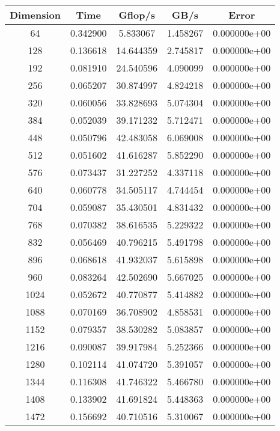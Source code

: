 \documentclass[12pt,letterpaper]{article}
\begin{document}
\begin{tabular}{ |c|c|c|c|c| } 
 \hline 
Dimension   &    Time  &  Gflop/s  &     GB/s   &       Error\\
 \hline \hline

        64  & 0.342900 &  5.833067 &  1.458267 & 0.000000e+00 \\
       128  & 0.136618 & 14.644359 &  2.745817 & 0.000000e+00 \\
       192  & 0.081910 & 24.540596 &  4.090099 & 0.000000e+00 \\
       256  & 0.065207 & 30.874997 &  4.824218 & 0.000000e+00 \\
       320  & 0.060056 & 33.828693 &  5.074304 & 0.000000e+00 \\
       384  & 0.052039 & 39.171232 &  5.712471 & 0.000000e+00 \\
       448  & 0.050796 & 42.483058 &  6.069008 & 0.000000e+00 \\
       512  & 0.051602 & 41.616287 &  5.852290 & 0.000000e+00 \\
       576  & 0.073437 & 31.227252 &  4.337118 & 0.000000e+00 \\
       640  & 0.060778 & 34.505117 &  4.744454 & 0.000000e+00 \\
       704  & 0.059087 & 35.430501 &  4.831432 & 0.000000e+00 \\
       768  & 0.070382 & 38.616535 &  5.229322 & 0.000000e+00 \\
       832  & 0.056469 & 40.796215 &  5.491798 & 0.000000e+00 \\
       896  & 0.068618 & 41.932037 &  5.615898 & 0.000000e+00 \\
       960  & 0.083264 & 42.502690 &  5.667025 & 0.000000e+00 \\
      1024  & 0.052672 & 40.770877 &  5.414882 & 0.000000e+00 \\
      1088  & 0.070169 & 36.708902 &  4.858531 & 0.000000e+00 \\
      1152  & 0.079357 & 38.530282 &  5.083857 & 0.000000e+00 \\
      1216  & 0.090087 & 39.917984 &  5.252366 & 0.000000e+00 \\
      1280  & 0.102114 & 41.074720 &  5.391057 & 0.000000e+00 \\
      1344  & 0.116308 & 41.746322 &  5.466780 & 0.000000e+00 \\
      1408  & 0.133902 & 41.691824 &  5.448363 & 0.000000e+00 \\
      1472  & 0.156692 & 40.710516 &  5.310067 & 0.000000e+00 \\

\end{tabular}
\end{document}
